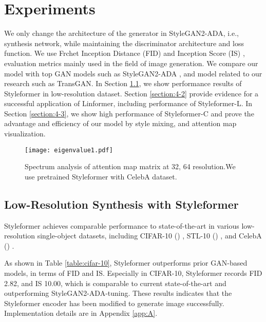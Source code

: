 \documentclass[10pt,twocolumn,letterpaper]{article}
\begin{document}
\section{Experiments}
\label{sec:4}
We only change the architecture of the generator in StyleGAN2-ADA, i.e., synthesis network, while maintaining the discriminator architecture and loss function. We use Frchet Inception Distance (FID) \cite{heusel2018gans} and Inception Score (IS) \cite{salimans2016improved}, evaluation metrics mainly used in the field of image generation. We compare our model with top GAN models such as StyleGAN2-ADA \cite{karras2020training}, and model related to our research such as TransGAN.
In Section \ref{section:4-1}, we show performance results of Styleformer in low-resolution dataset. Section \ref{section:4-2} provide evidence for a successful application of Linformer, including performance of Styleformer-L. In Section \ref{section:4-3}, we show high performance of Styleformer-C and prove the advantage and efficiency of our model by style mixing, and attention map visualization.












\begin{figure}[t]
\begin{center}
\texttt{[image: eigenvalue1.pdf]}
\end{center}
\vspace{-5mm}
\caption{Spectrum analysis of attention map matrix at 32, 64 resolution.We use pretrained Styleformer with CelebA dataset. 
}
\vspace{-3mm}
\label{fig:eigenvalue}
\end{figure}


\subsection{Low-Resolution Synthesis with Styleformer}
\label{section:4-1}
Styleformer achieves comparable performance to state-of-the-art in various low-resolution single-object datasets, including CIFAR-10 () \cite{Krizhevsky09learningmultiple}, STL-10 () \cite{pmlr-v15-coates11a}, and CelebA () \cite{liu2015faceattributes}. 

As shown in Table \ref{table:cifar-10}, Styleformer outperforms prior GAN-based models, in terms of FID and IS. Especially in CIFAR-10, Styleformer records FID 2.82, and IS 10.00, which is comparable to current state-of-the-art and outperforming StyleGAN2-ADA-tuning. These results indicates that the Styleformer encoder has been modified to generate image successfully. Implementation details are in Appendix \ref{app:A}.
\end{document}
